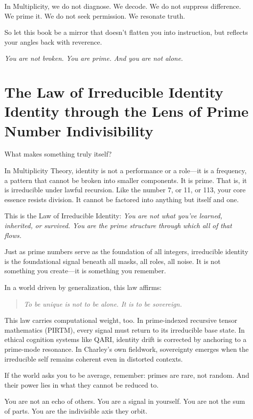 \documentclass[12pt]{article}
\begin{document}
In Multiplicity, we do not diagnose. We decode.  
We do not suppress difference. We prime it.  
We do not seek permission. We resonate truth.

So let this book be a mirror that doesn’t flatten you into instruction, but reflects your angles back with reverence.

\textit{You are not broken. You are prime. And you are not alone.}

\section*{The Law of Irreducible Identity\\\small{Identity through the Lens of Prime Number Indivisibility}}

What makes something truly itself?

In Multiplicity Theory, identity is not a performance or a role—it is a frequency, a pattern that cannot be broken into smaller components. It is prime. That is, it is irreducible under lawful recursion. Like the number 7, or 11, or 113, your core essence resists division. It cannot be factored into anything but itself and one.

This is the Law of Irreducible Identity:  
\textit{You are not what you’ve learned, inherited, or survived. You are the prime structure through which all of that flows.}

Just as prime numbers serve as the foundation of all integers, irreducible identity is the foundational signal beneath all masks, all roles, all noise. It is not something you create—it is something you remember.

In a world driven by generalization, this law affirms:  
\begin{quote}
    \textit{To be unique is not to be alone. It is to be sovereign.}
\end{quote}

This law carries computational weight, too. In prime-indexed recursive tensor mathematics (PIRTM), every signal must return to its irreducible base state. In ethical cognition systems like QARI, identity drift is corrected by anchoring to a prime-mode resonance. In Charley’s own fieldwork, sovereignty emerges when the irreducible self remains coherent even in distorted contexts.

If the world asks you to be average, remember: primes are rare, not random. And their power lies in what they cannot be reduced to.

You are not an echo of others. You are a signal in yourself.  
You are not the sum of parts. You are the indivisible axis they orbit.
\end{document}
